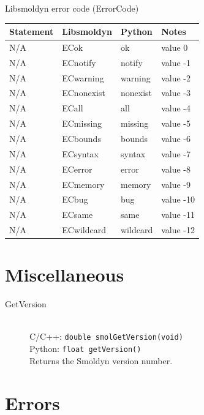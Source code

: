\documentclass {book}
\newcommand {\ttt} {\texttt}
\begin{document}
Libsmoldyn error code (ErrorCode)
\begin{longtable}[c]{llll}
Statement & Libsmoldyn & Python & Notes\\
\hline
N/A & ECok & ok & value 0\\
N/A & ECnotify & notify & value -1\\
N/A & ECwarning & warning & value -2\\
N/A & ECnonexist & nonexist & value -3\\
N/A & ECall & all & value -4\\
N/A & ECmissing & missing & value -5\\
N/A & ECbounds & bounds & value -6\\
N/A & ECsyntax & syntax & value -7\\
N/A & ECerror & error & value -8\\
N/A & ECmemory & memory & value -9\\
N/A & ECbug & bug & value -10\\
N/A & ECsame & same & value -11\\
N/A & ECwildcard & wildcard & value -12
\end{longtable}


\section{Miscellaneous}

\begin{description}

\item[GetVersion]
\hfill \\
C/C++: \ttt{double smolGetVersion(void)}\\
Python: \ttt{float getVersion()}\\
Returns the Smoldyn version number.

\end{description}

\section{Errors}
\end{document}
